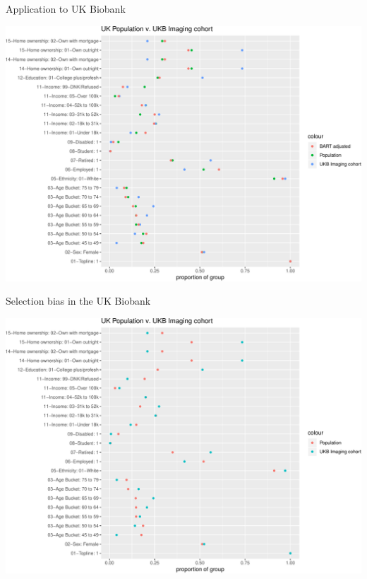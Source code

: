 \documentclass[
  ignorenonframetext,
]{beamer}
\begin{document}
\begin{frame}{Application to UK Biobank}
\protect\hypertarget{application-to-uk-biobank}{}

\includegraphics{fmrib-deck-20191002_files/figure-beamer/fig-ukb-results-1.pdf}

\end{frame}

\begin{frame}{Selection bias in the UK Biobank}
\protect\hypertarget{selection-bias-in-the-uk-biobank-2}{}

\includegraphics{fmrib-deck-20191002_files/figure-beamer/fig-1-1.pdf}

\end{frame}
\end{document}
